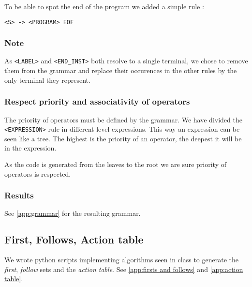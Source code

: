 To be able to spot the end of the program we added a simple rule :

\begin{center}
\begin{BVerbatim}[commandchars=\\\{\}]
<S> -> <PROGRAM> EOF
\end{BVerbatim}
\end{center}

\subsubsection{Note}

As \verb!<LABEL>! and \verb!<END_INST>! both resolve to a single terminal, we chose to remove them from the grammar and replace their occurences in the other rules by the only terminal they represent.

\subsubsection{Respect priority and associativity of operators}

The priority of operators must be defined by the grammar. We have divided the \verb!<EXPRESSION>! rule in different level expressions. This way an expression can be seen like a tree. The highest is the priority of an operator, the deepest it will be in the expression.

As the code is generated from the leaves to the root we are sure priority of operators is respected.  

\subsubsection{Results}
\label{expression}
See \ref{app:grammar} for the resulting grammar.

\subsection{First, Follows, Action table}

We wrote python scripts implementing algorithms seen in class to generate the \emph{first}, \emph{follow} sets and the \emph{action table}. See \ref{app:firsts and follows} and \ref{app:action table}.

